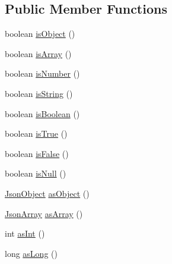 \subsection*{Public Member Functions}
\begin{DoxyCompactItemize}
\item 
boolean \hyperlink{classcom_1_1ingeniigroup_1_1stratux_1_1_tools_1_1_json_micro_1_1_json_value_a1c10b276446f8e86f600dd5ac96dcd9d}{is\+Object} ()
\item 
boolean \hyperlink{classcom_1_1ingeniigroup_1_1stratux_1_1_tools_1_1_json_micro_1_1_json_value_ac7b9d15a0169839ca4e35ee93e0ac6df}{is\+Array} ()
\item 
boolean \hyperlink{classcom_1_1ingeniigroup_1_1stratux_1_1_tools_1_1_json_micro_1_1_json_value_ad6975f676985b8a4e23bf8dd32eef37f}{is\+Number} ()
\item 
boolean \hyperlink{classcom_1_1ingeniigroup_1_1stratux_1_1_tools_1_1_json_micro_1_1_json_value_ab9a440737894433864f67405794892ab}{is\+String} ()
\item 
boolean \hyperlink{classcom_1_1ingeniigroup_1_1stratux_1_1_tools_1_1_json_micro_1_1_json_value_ab86267e4be1d1f44292f04ad25ae84ae}{is\+Boolean} ()
\item 
boolean \hyperlink{classcom_1_1ingeniigroup_1_1stratux_1_1_tools_1_1_json_micro_1_1_json_value_aecc719d69b43cc223a29fe6dd17d72e5}{is\+True} ()
\item 
boolean \hyperlink{classcom_1_1ingeniigroup_1_1stratux_1_1_tools_1_1_json_micro_1_1_json_value_a50a739bc1b8139096182171580691ace}{is\+False} ()
\item 
boolean \hyperlink{classcom_1_1ingeniigroup_1_1stratux_1_1_tools_1_1_json_micro_1_1_json_value_a4d334327878e34987b0ea995cb6ef52e}{is\+Null} ()
\item 
\hyperlink{classcom_1_1ingeniigroup_1_1stratux_1_1_tools_1_1_json_micro_1_1_json_object}{Json\+Object} \hyperlink{classcom_1_1ingeniigroup_1_1stratux_1_1_tools_1_1_json_micro_1_1_json_value_a9b02091d2364f0e74a94ed5a6454ef9b}{as\+Object} ()
\item 
\hyperlink{classcom_1_1ingeniigroup_1_1stratux_1_1_tools_1_1_json_micro_1_1_json_array}{Json\+Array} \hyperlink{classcom_1_1ingeniigroup_1_1stratux_1_1_tools_1_1_json_micro_1_1_json_value_a6f56d77a18407a765a64de05048bae54}{as\+Array} ()
\item 
int \hyperlink{classcom_1_1ingeniigroup_1_1stratux_1_1_tools_1_1_json_micro_1_1_json_value_a0ef914be41a4ebc5f682cbfe3257ac4a}{as\+Int} ()
\item 
long \hyperlink{classcom_1_1ingeniigroup_1_1stratux_1_1_tools_1_1_json_micro_1_1_json_value_a2239597c6128e977fcce37428ff4f7da}{as\+Long} ()

\end{DoxyCompactItemize}

